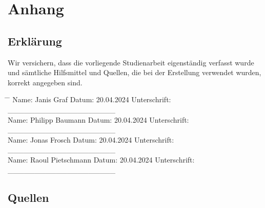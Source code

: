 \documentclass[10pt,a4paper]{article}
\begin{document}
\section{Anhang}
\subsection{Erklärung}
Wir versichern, dass die vorliegende Studienarbeit eigenständig verfasst wurde und sämtliche Hilfsmittel und Quellen, die bei der Erstellung verwendet wurden, korrekt angegeben sind.

\vspace{0.5cm}

\begin{tabbing}
    \hspace{5cm} \= \hspace{3cm} \= \kill
    Name: Janis Graf \> Datum: 20.04.2024 \> Unterschrift: \_\_\_\_\_\_\_\_\_\_\_\_\_\_\_\_\_\_\_\_ \\[0.5cm]
    Name: Philipp Baumann \> Datum: 20.04.2024 \> Unterschrift: \_\_\_\_\_\_\_\_\_\_\_\_\_\_\_\_\_\_\_\_ \\[0.5cm]
    Name: Jonas Frosch \> Datum: 20.04.2024 \> Unterschrift: \_\_\_\_\_\_\_\_\_\_\_\_\_\_\_\_\_\_\_\_ \\[0.5cm]
    Name: Raoul Pietschmann \> Datum: 20.04.2024 \> Unterschrift: \_\_\_\_\_\_\_\_\_\_\_\_\_\_\_\_\_\_\_\_
\end{tabbing}
\subsection{Quellen}
\end{document}
